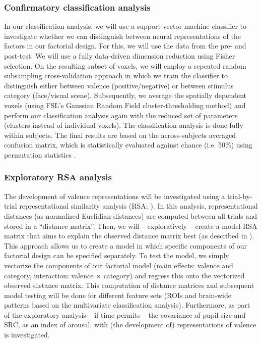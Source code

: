 \documentclass[12pt,a4paper]{article}\usepackage[]{graphicx}\usepackage[]{color}
\begin{document}
\subsubsection{Confirmatory classification analysis}
In our classification analysis, we will use a support vector machine classifier to investigate whether we can distinguish between neural representations of the factors in our factorial design. For this, we will use the data from the pre- and post-test. We will use a fully data-driven dimension reduction using Fisher selection. On the resulting subset of voxels, we will employ a repeated random subsampling cross-validation approach in which we train the classifier to distinguish either between valence (positive/negative) or between stimulus category (face/visual scene). Subsequently, we average the spatially dependent voxels (using FSL's Gaussian Random Field cluster-thresholding method) and perform our classification analysis again with the reduced set of parameters (clusters instead of individual voxels). The classification analysis is done fully within subjects. The final results are based on the across-subjects averaged confusion matrix, which is statistically evaluated against chance (i.e. 50\%) using permutation statistics \citep{nichols2002}.     

\subsubsection{Exploratory RSA analysis}
The development of valence representations will be investigated using a trial-by-trial representational similarity analysis (RSA; \citealp{kriegeskorte2008}). In this analysis, representational distances (as normalized Euclidian distances) are computed between all trials and stored in a ``distance matrix''. Then, we will -- exploratively -- create a model-RSA matrix that aims to explain the observed distance matrix best (as described in \citealp{walther2015}). This approach allows us to create a model in which specific components of our factorial design can be specified separately. To test the model, we simply vectorize the components of our factorial model (main effects: valence and category, interaction: valence $\times$ category) and regress this onto the vectorized observed distance matrix. This computation of distance matrices and subsequent model testing will be done for different feature sets (ROIs and brain-wide patterns based on the multivariate classification analysis). Furthermore, as part of the exploratory analysis -- if time permits -- the covariance of pupil size and SRC, as an index of arousal, with (the development of) representations of valence is investigated.
\end{document}
